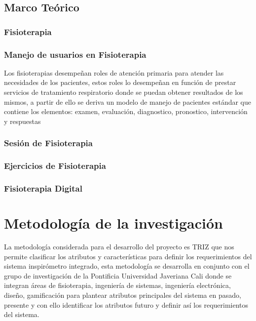 \documentclass[12pt]{article}
\begin{document}
\subsection{Marco Teórico}

\subsubsection{Fisioterapia}



\subsubsection{Manejo de usuarios en Fisioterapia}

Los fisioterapias desempeñan roles de atención primaria para atender las necesidades de los pacientes, estos roles lo desempeñan en función de prestar  servicios de tratamiento respiratorio donde se puedan obtener resultados de los mismos, a partir de ello se deriva un modelo de manejo de pacientes estándar que contiene los elementos:  examen, evaluación, diagnostico, pronostico, intervención y respuestas 

\subsubsection{Sesión de Fisioterapia}

\subsubsection{Ejercicios de Fisioterapia}

\subsubsection{Fisioterapia Digital}







\section{Metodología de la investigación}

La metodología considerada para el desarrollo del proyecto es TRIZ que nos permite clasificar los atributos y características para definir los requerimientos del sistema inspirómetro integrado, esta metodología se desarrolla en conjunto con el grupo de investigación de la Pontificia Universidad Javeriana Cali donde se integran áreas de fisioterapia, ingeniería de sistemas, ingeniería electrónica, diseño, gamificación para plantear atributos principales del sistema en pasado, presente y con ello identificar los atributos futuro y definir así los requerimientos del sistema.
\end{document}
